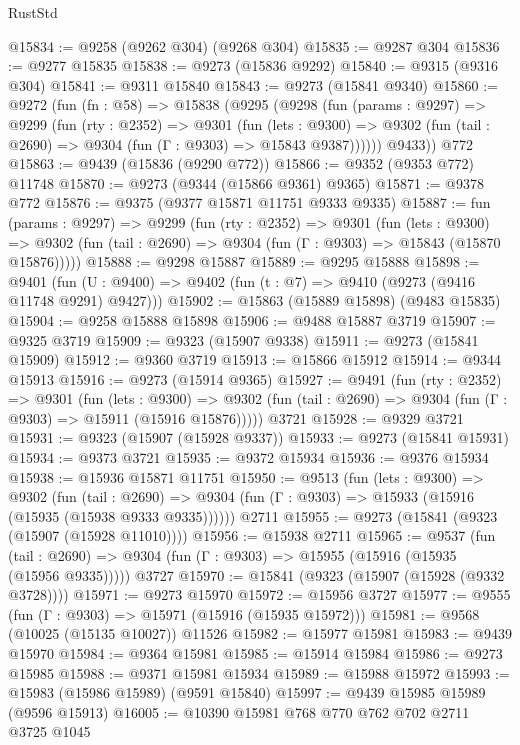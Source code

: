 \begin{lexlean}{RustStd}
\begin{coremodule}
@15834 := @9258 (@9262 @304) (@9268 @304)
@15835 := @9287 @304
@15836 := @9277 @15835
@15838 := @9273 (@15836 @9292)
@15840 := @9315 (@9316 @304)
@15841 := @9311 @15840
@15843 := @9273 (@15841 @9340)
@15860 := @9272
    (fun (fn : @58) =>
    @15838
      (@9295
        (@9298
          (fun (params : @9297) =>
          @9299
            (fun (rty : @2352) =>
            @9301
              (fun (lets : @9300) =>
              @9302 (fun (tail : @2690) => @9304 (fun (Γ : @9303) => @15843 @9387))))))
        @9433))
    @772
@15863 := @9439 (@15836 (@9290 @772))
@15866 := @9352 (@9353 @772) @11748
@15870 := @9273 (@9344 (@15866 @9361) @9365)
@15871 := @9378 @772
@15876 := @9375 (@9377 @15871 @11751 @9333 @9335)
@15887 := fun (params : @9297) =>
  @9299
    (fun (rty : @2352) =>
    @9301
      (fun (lets : @9300) =>
      @9302 (fun (tail : @2690) => @9304 (fun (Γ : @9303) => @15843 (@15870 @15876)))))
@15888 := @9298 @15887
@15889 := @9295 @15888
@15898 := @9401
    (fun (U : @9400) => @9402 (fun (t : @7) => @9410 (@9273 (@9416 @11748 @9291) @9427)))
@15902 := @15863 (@15889 @15898) (@9483 @15835)
@15904 := @9258 @15888 @15898
@15906 := @9488 @15887 @3719
@15907 := @9325 @3719
@15909 := @9323 (@15907 @9338)
@15911 := @9273 (@15841 @15909)
@15912 := @9360 @3719
@15913 := @15866 @15912
@15914 := @9344 @15913
@15916 := @9273 (@15914 @9365)
@15927 := @9491
    (fun (rty : @2352) =>
    @9301
      (fun (lets : @9300) =>
      @9302 (fun (tail : @2690) => @9304 (fun (Γ : @9303) => @15911 (@15916 @15876)))))
    @3721
@15928 := @9329 @3721
@15931 := @9323 (@15907 (@15928 @9337))
@15933 := @9273 (@15841 @15931)
@15934 := @9373 @3721
@15935 := @9372 @15934
@15936 := @9376 @15934
@15938 := @15936 @15871 @11751
@15950 := @9513
    (fun (lets : @9300) =>
    @9302
      (fun (tail : @2690) =>
      @9304 (fun (Γ : @9303) => @15933 (@15916 (@15935 (@15938 @9333 @9335))))))
    @2711
@15955 := @9273 (@15841 (@9323 (@15907 (@15928 @11010))))
@15956 := @15938 @2711
@15965 := @9537
    (fun (tail : @2690) => @9304 (fun (Γ : @9303) => @15955 (@15916 (@15935 (@15956 @9335)))))
    @3727
@15970 := @15841 (@9323 (@15907 (@15928 (@9332 @3728))))
@15971 := @9273 @15970
@15972 := @15956 @3727
@15977 := @9555 (fun (Γ : @9303) => @15971 (@15916 (@15935 @15972)))
@15981 := @9568 (@10025 (@15135 @10027)) @11526
@15982 := @15977 @15981
@15983 := @9439 @15970
@15984 := @9364 @15981
@15985 := @15914 @15984
@15986 := @9273 @15985
@15988 := @9371 @15981 @15934
@15989 := @15988 @15972
@15993 := @15983 (@15986 @15989) (@9591 @15840)
@15997 := @9439 @15985 @15989 (@9596 @15913)
@16005 := @10390 @15981 @768 @770 @762 @702 @2711 @3725 @1045

\end{coremodule}
\end{lexlean}
